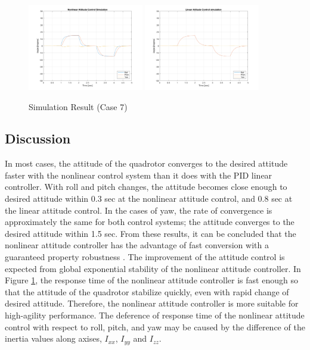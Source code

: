 \begin{figure}
    \centering
    \includegraphics[width=0.45\textwidth]{graphics/custom_01_non.png}
    \includegraphics[width=0.45\textwidth]{graphics/custom_01_pid.png}
    \caption{Simulation Result (Case 7)}
    \label{fig:sim_7}
\end{figure}

\subsection{Discussion}
In most cases, the attitude of the quadrotor converges to the desired attitude faster with the nonlinear control system than it does with the PID linear controller. With roll and pitch changes, the attitude becomes close enough to desired attitude within 0.3 sec at the nonlinear attitude control, and 0.8 sec at the linear attitude control. In the cases of yaw, the rate of convergence is approximately the same for both control systems; the attitude converges to the desired attitude within 1.5 sec. From these results, it can be concluded that the nonlinear attitude controller has the advantage of fast conversion with a guaranteed property robustness \cite{Morgan16}\cite{chung13} . The improvement of the attitude control is expected from global exponential stability of the nonlinear attitude controller. In Figure \ref{fig:sim_7}, the response time of the nonlinear attitude controller is fast enough so that the attitude of the quadrotor stabilize quickly, even with rapid change of desired attitude. Therefore, the nonlinear attitude controller is more suitable for high-agility performance. The deference of response time of the nonlinear attitude control with respect to roll, pitch, and yaw may be caused by the difference of the inertia values along axises, \(I_{xx}\), \(I_{yy}\) and \(I_{zz}\). 

